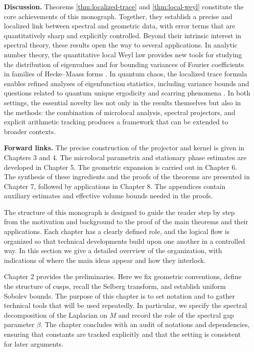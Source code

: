 \noindent \textbf{Discussion.}
Theorems \ref{thm:localized-trace} and \ref{thm:local-weyl} constitute the core
achievements of this monograph. Together, they establish a precise and
localized link between spectral and geometric data, with error terms that are
quantitatively sharp and explicitly controlled. Beyond their intrinsic interest
in spectral theory, these results open the way to several applications. In
analytic number theory, the quantitative local Weyl law provides new tools for
studying the distribution of eigenvalues and for bounding variances of Fourier
coefficients in families of Hecke–Maass forms
\cite{IwaniecSpectral,Sarnak2004,MichelVenkatesh2010}. In quantum chaos, the
localized trace formula enables refined analyses of eigenfunction statistics,
including variance bounds and questions related to quantum unique ergodicity
and scarring phenomena \cite{LindenstraussQUE,SoundararajanQUE}. In both
settings, the essential novelty lies not only in the results themselves but
also in the methods: the combination of microlocal analysis, spectral
projectors, and explicit arithmetic tracking produces a framework that can be
extended to broader contexts.

\medskip

\noindent \textbf{Forward links.}
The precise construction of the projector and kernel is given in Chapters 3 and
4. The microlocal parametrix and stationary phase estimates are developed in
Chapter 5. The geometric expansion is carried out in Chapter 6. The synthesis
of these ingredients and the proofs of the theorems are presented in Chapter 7,
followed by applications in Chapter 8. The appendices contain auxiliary
estimates and effective volume bounds needed in the proofs.

The structure of this monograph is designed to guide the reader step by step
from the motivation and background to the proof of the main theorems and their
applications. Each chapter has a clearly defined role, and the logical flow is
organized so that technical developments build upon one another in a controlled
way. In this section we give a detailed overview of the organization, with
indications of where the main ideas appear and how they interlock.

Chapter 2 provides the preliminaries. Here we fix geometric conventions, define
the structure of cusps, recall the Selberg transform, and establish uniform
Sobolev bounds. The purpose of this chapter is to set notation and to gather
technical tools that will be used repeatedly. In particular, we specify the
spectral decomposition of the Laplacian on $M$ and record the role of the
spectral gap parameter $\beta$. The chapter concludes with an audit of
notations and dependencies, ensuring that constants are tracked explicitly and
that the setting is consistent for later arguments.


